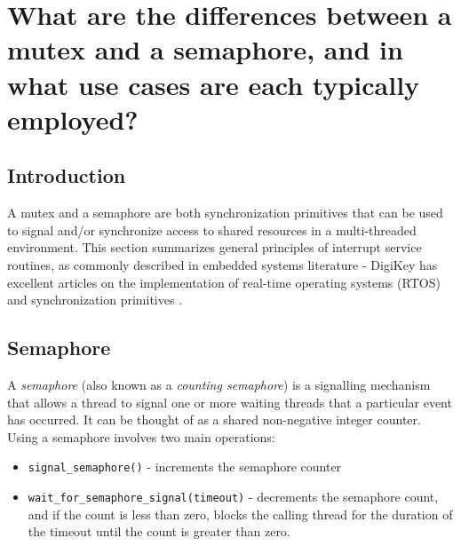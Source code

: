 \documentclass[main.tex]{subfiles}
\begin{document}
\section{What are the differences between a mutex and a semaphore, and in what use cases are each typically employed?}

\spoilerline

\subsection{Introduction}
\noindent A mutex and a semaphore are both synchronization primitives that can be used to signal and/or synchronize access to shared resources in a multi-threaded environment. This section summarizes general principles of interrupt service routines, as commonly described in embedded systems literature - DigiKey has excellent articles on the implementation of real-time operating systems (RTOS) and synchronization primitives \cite{digikey_rtos}.

\subsection{Semaphore}
A \textit{semaphore} (also known as a \textit{counting semaphore}) is a signalling mechanism that allows a thread to signal one or more waiting threads that a particular event has occurred. It can be thought of as a shared non-negative integer counter.
\newline
\newline
Using a semaphore involves two main operations: \begin{itemize}
    \item \texttt{signal\_semaphore()} - increments the semaphore counter
    \item \texttt{wait\_for\_semaphore\_signal(timeout)} - decrements the semaphore count, and if the count is less than zero, blocks the calling thread for the duration of the timeout until the count is greater than zero.
\end{itemize}
\end{document}
